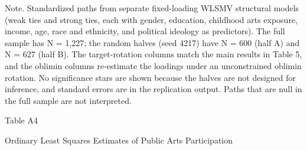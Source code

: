 \documentclass[
  12pt
]{article}
\begin{document}
Note. Standardized paths from separate fixed-loading WLSMV structural models (weak ties and strong ties, each with gender, education, childhood arts exposure, income, age, race and ethnicity, and political ideology as predictors). The full sample has N = 1,227; the random halves (seed 4217) have N = 600 (half A) and N = 627 (half B). The target-rotation columns match the main results in Table 5, and the oblimin columns re-estimate the loadings under an unconstrained oblimin rotation. No significance stars are shown because the halves are not designed for inference, and standard errors are in the replication output. Paths that are null in the full sample are not interpreted.


Table A4

Ordinary Least Squares Estimates of Public Arts Participation
\end{document}

